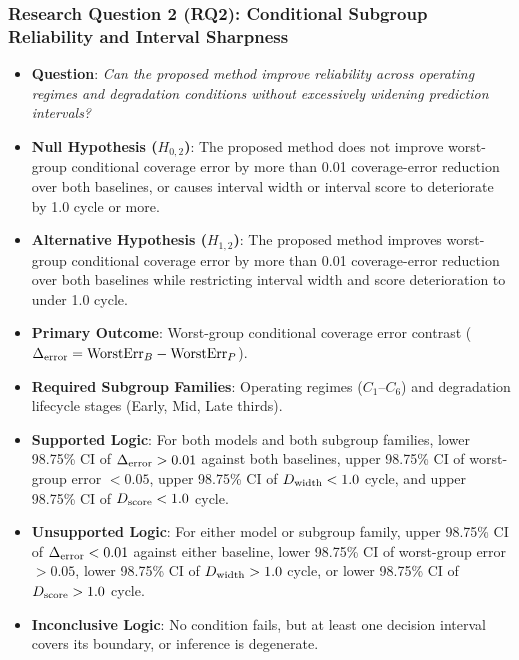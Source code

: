 \subsubsection*{Research Question 2 (RQ2): Conditional Subgroup Reliability and Interval Sharpness}
\begin{itemize}
  \item \textbf{Question}: \textit{Can the proposed method improve reliability across operating regimes and degradation conditions without excessively widening prediction intervals?}
  \item \textbf{Null Hypothesis ($H_{0,2}$)}: The proposed method does not improve worst-group conditional coverage error by more than 0.01 coverage-error reduction over both baselines, or causes interval width or interval score to deteriorate by 1.0 cycle or more.
  \item \textbf{Alternative Hypothesis ($H_{1,2}$)}: The proposed method improves worst-group conditional coverage error by more than 0.01 coverage-error reduction over both baselines while restricting interval width and score deterioration to under 1.0 cycle.
  \item \textbf{Primary Outcome}: Worst-group conditional coverage error contrast ($\Delta_{\text{error}} = \text{WorstErr}_B - \text{WorstErr}_P$).
  \item \textbf{Required Subgroup Families}: Operating regimes ($C_1$--$C_6$) and degradation lifecycle stages (Early, Mid, Late thirds).
  \item \textbf{Supported Logic}: For both models and both subgroup families, lower 98.75\% CI of $\Delta_{\text{error}} > 0.01$ against both baselines, upper 98.75\% CI of worst-group error $< 0.05$, upper 98.75\% CI of $D_{\text{width}} < 1.0$ cycle, and upper 98.75\% CI of $D_{\text{score}} < 1.0$ cycle.
  \item \textbf{Unsupported Logic}: For either model or subgroup family, upper 98.75\% CI of $\Delta_{\text{error}} < 0.01$ against either baseline, lower 98.75\% CI of worst-group error $> 0.05$, lower 98.75\% CI of $D_{\text{width}} > 1.0$ cycle, or lower 98.75\% CI of $D_{\text{score}} > 1.0$ cycle.
  \item \textbf{Inconclusive Logic}: No condition fails, but at least one decision interval covers its boundary, or inference is degenerate.
\end{itemize}

